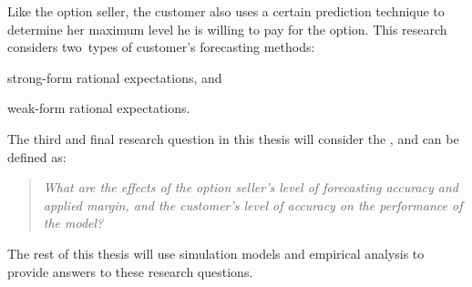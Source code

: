 Like the option seller, the customer also uses a certain prediction technique to determine her maximum level he is willing to pay for the option. This research considers two~types of customer's forecasting methods:
\begin{compactitem}
    \item strong-form rational expectations, and
    \item weak-form rational expectations.
\end{compactitem}

\noindent
The third and final research question in this thesis will consider the , and can be defined as:

\begin{quote}\emph{What are the effects of the option seller's level of forecasting accuracy and applied margin, and the customer's level of accuracy on the performance of the model?}\end{quote}

The rest of this thesis will use simulation models and empirical analysis to provide answers to these research questions.